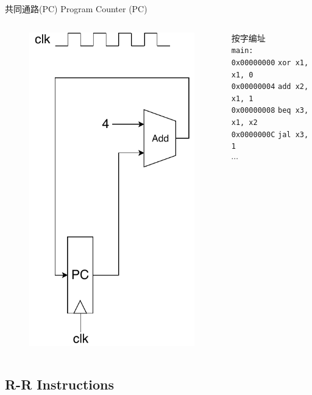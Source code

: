 \documentclass{myslide}
\begin{document}
\begin{frame}[fragile]{共同通路(PC)}
Program Counter (PC)
\begin{columns}
\begin{column}{0.5\linewidth}
\begin{figure}
\centering
\includegraphics[width=0.5\linewidth]{fig/Lecture2/Datapath-PC.pdf}
\end{figure}
\end{column}
\begin{column}{0.5\linewidth}
按字编址\\
\qquad\qquad\qquad\verb'main:'\\
\verb'0x00000000' \qquad\verb'xor x1, x1, 0'\\
\verb'0x00000004' \qquad\verb'add x2, x1, 1'\\
\verb'0x00000008' \qquad\verb'beq x3, x1, x2'\\
\verb'0x0000000C' \qquad\verb'jal x3, 1'\\
$\cdots$
\end{column}
\end{columns}
\end{frame}

\subsection{R-R Instructions}
\begin{frame}
\subsectionpage
\end{frame}
\end{document}
